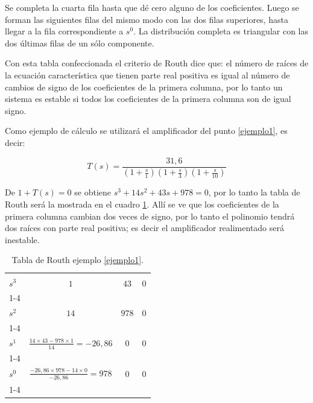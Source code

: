 Se completa la cuarta fila hasta que dé cero alguno de los
coeficientes. Luego se forman las siguientes filas del mismo modo
con las dos filas superiores, hasta llegar a la fila correspondiente
a $s^0$. La distribución completa es triangular con las dos últimas
filas de un sólo componente.

Con esta tabla confeccionada el criterio de Routh dice que: el
número de raíces de la ecuación característica que tienen parte real
positiva es igual al número de cambios de signo de los coeficientes
de la primera columna, por lo tanto un sistema es estable si todos
los coeficientes de la primera columna son de igual signo.

Como ejemplo de cálculo se utilizará el amplificador del punto
\ref{ejemplo1}, es decir:


	\begin{equation}
		\nonumber
		T(s)=\frac{\displaystyle 31,6}{\displaystyle (1+\frac{\displaystyle
				s}{\displaystyle 1})(1+\frac{\displaystyle s}{\displaystyle
				3})(1+\frac{\displaystyle s}{\displaystyle 10})}
	\end{equation}





De $1+T(s)=0$ se obtiene $s^3+14s^2+43s+978=0$, por lo tanto la
tabla de Routh será la mostrada en el cuadro \ref{tabla2}. Allí se
ve que los coeficientes de la primera columna cambian dos veces de
signo, por lo tanto el polinomio tendrá dos raíces con parte real
positiva; es decir el amplificador realimentado será inestable.

\begin{table}
	\centering
	\begin{tabular}{|l||c|c|c|}
		\hline
		&          &      &        \\
		$s^3$    & $1$         & $43$     & $0$     \\
		\cline{1-4}
		&          &      &     \\
		$s^2$  & $14$    & $978$     & $0$     \\
		\cline{1-4}
		&          &      &        \\
		$s^1$ & $\frac{\displaystyle 14\times43-978\times1}{\displaystyle 14}=-26,86$         & $0$     & $0$     \\
		\cline{1-4}
		&          &      &        \\
		$s^0$      & $\frac{\displaystyle -26,86\times 978-14\times 0}{\displaystyle -26,86}=978$         & $0$       & $0$ \\
		\cline{1-4}
		\hline
	\end{tabular}
	\caption{Tabla de Routh ejemplo \ref{ejemplo1}.}\label{tabla2}
\end{table}

